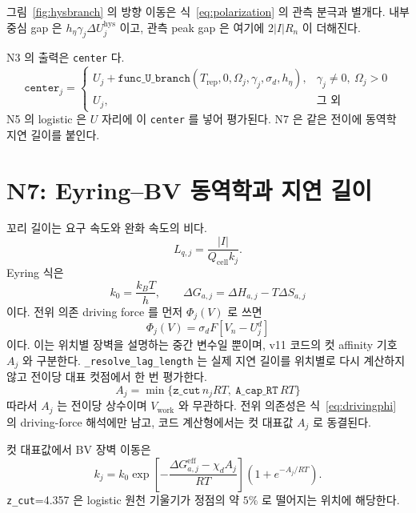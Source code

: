\documentclass[11pt,a4paper]{article}
\newcommand{\cell}{\mathrm{cell}}
\newcommand{\eff}{\mathrm{eff}}
\newcommand{\hys}{\mathrm{hys}}
\newcommand{\work}{\mathrm{work}}
\newcommand{\rep}{\mathrm{rep}}
\begin{document}
그림~\ref{fig:hysbranch} 의 방향 이동은 식~\eqref{eq:polarization} 의 관측 분극과 별개다. 내부 중심 gap 은 $h_\eta\gamma_j\Delta U_j^\hys$ 이고, 관측 peak gap 은 여기에 $2|I|R_n$ 이 더해진다.

N3 의 출력은 \texttt{center} 다.
\begin{equation}
\texttt{center}_j=
\begin{cases}
U_j+\texttt{func\_U\_branch}(T_{\rep},0,\Omega_j,\gamma_j,\sigma_d,h_\eta),&
\gamma_j\ne0,\ \Omega_j>0\\
U_j,&\text{그 외}
\end{cases}
\label{eq:centerchoice}
\end{equation}
N5 의 logistic 은 $U$ 자리에 이 \texttt{center} 를 넣어 평가된다. N7 은 같은 전이에 동역학 지연 길이를 붙인다.

\section{N7: Eyring--BV 동역학과 지연 길이}\label{sec:n7}
꼬리 길이는 요구 속도와 완화 속도의 비다.
\begin{equation}
L_{q,j}=\frac{|I|}{Q_\cell k_j}.
\label{eq:Lqbasic}
\end{equation}
Eyring 식은
\begin{equation}
k_0=\frac{k_BT}{h},\qquad
\Delta G_{a,j}=\Delta H_{a,j}-T\Delta S_{a,j}
\label{eq:eyringv7}
\end{equation}
이다. 전위 의존 driving force 를 먼저 $\Phi_j(V)$ 로 쓰면
\begin{equation}
\Phi_j(V)=\sigma_dF\!\left[V_n-U_j^d\right]
\label{eq:drivingphi}
\end{equation}
이다. 이는 위치별 장벽을 설명하는 중간 변수일 뿐이며, v11 코드의 컷 affinity 기호 $A_j$ 와 구분한다. \texttt{\_resolve\_lag\_length} 는 실제 지연 길이를 위치별로 다시 계산하지 않고 전이당 대표 컷점에서 한 번 평가한다.
\begin{equation}
\boxed{\;A_j=\min\{\texttt{z\_cut}\,n_jRT,\ \texttt{A\_cap\_RT}\,RT\}\;}
\label{eq:Acut}
\end{equation}
따라서 $A_j$ 는 전이당 상수이며 $V_{\work}$ 와 무관하다. 전위 의존성은 식~\eqref{eq:drivingphi} 의 driving-force 해석에만 남고, 코드 계산형에서는 컷 대표값 $A_j$ 로 동결된다.

컷 대표값에서 BV 장벽 이동은
\begin{equation}
k_j=k_0\exp\!\left[-\frac{\Delta G_{a,j}^{\eff}-\chi_d A_j}{RT}\right]\left(1+e^{-A_j/RT}\right).
\label{eq:kv7}
\end{equation}
\texttt{z\_cut}=4.357 은 logistic 원천 기울기가 정점의 약 $5\%$ 로 떨어지는 위치에 해당한다.
\end{document}
